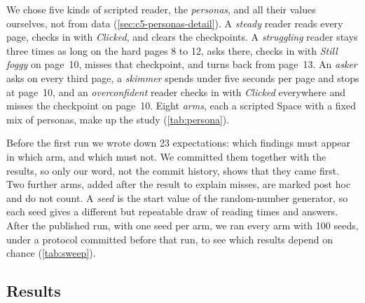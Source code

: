 We chose five kinds of scripted reader, the \emph{personas}, and all their
values ourselves, not from data (\cref{sec:c5-personas-detail}). A
\emph{steady} reader reads every page, checks in with \emph{Clicked}, and
clears the checkpoints. A \emph{struggling} reader stays three times as long
on the hard pages 8 to 12, asks there, checks in with \emph{Still foggy} on
page~10, misses that checkpoint, and turns back from page~13. An \emph{asker}
asks on every third page, a \emph{skimmer} spends under five seconds per page
and stops at page~10, and an \emph{overconfident} reader checks in with
\emph{Clicked} everywhere and misses the checkpoint on page~10. Eight
\emph{arms}, each a scripted Space with a fixed mix of personas, make up the
study (\cref{tab:persona}).

Before the first run we wrote down 23 expectations: which findings must appear
in which arm, and which must not. We committed them together with the results,
so only our word, not the commit history, shows that they came first. Two
further arms, added after the result to explain misses, are marked post hoc
and do not count. A \emph{seed} is the start value of the random-number
generator, so each seed gives a different but repeatable draw of reading times
and answers. After the published run, with one seed per arm, we ran every arm
with 100 seeds, under a protocol committed before that run, to see which
results depend on chance (\cref{tab:sweep}).

\subsection{Results}
\label{sec:c5-results}


